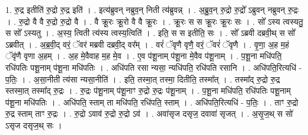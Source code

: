\documentclass[17pt]{extarticle}
\begin{document}
1. रु॒द्र इतीति॑ रु॒द्रो रु॒द्र इति॑ । . इत्य॑ब्रुवन् नब्रुव॒न् निती त्य॑ब्रुवन्न् । . अ॒ब्रु॒व॒न् रु॒द्रो रु॒द्रो᳚ ऽब्रुवन् नब्रुवन् रु॒द्रः । . रु॒द्रो वै वै रु॒द्रो रु॒द्रो वै । . वै क्रू॒रः क्रू॒रो वै वै क्रू॒रः । . क्रू॒रः स स क्रू॒रः क्रू॒रः सः । . सो᳚ ऽस्य त्वस्यतु॒ स सो᳚ ऽस्यतु । . अ॒स्य॒ त्विती त्य॑स्य त्वस्य॒त्विति॑ । . इति॒ स स इतीति॒ सः । . सो᳚ ऽब्रवी दब्रवी॒थ् स सो᳚ ऽब्रवीत् । . अ॒ब्र॒वी॒द् वरं॒ ॅवर॑ मब्रवी दब्रवी॒द् वर᳚म् । . वरं॑ ॅवृणै वृणै॒ वरं॒ ॅवरं॑ ॅवृणै । . वृ॒णा॒ अ॒ह म॒हं ॅवृ॑णै वृणा अ॒हम् । . अ॒ह मे॒वैवाह म॒ह मे॒व । . ए॒व प॑शू॒नाम् प॑शू॒ना मे॒वैव प॑शू॒नाम् । . प॒शू॒ना मधि॑पति॒ रधि॑पतिः पशू॒नाम् प॑शू॒ना मधि॑पतिः । . अधि॑पति रसा न्यसा॒ न्यधि॑पति॒ रधि॑पति रसानि । . अधि॑पति॒रित्यधि॑ - प॒तिः॒ । . अ॒सा॒नीती त्य॑सा न्यसा॒नीति॑ । . इति॒ तस्मा॒त् तस्मा॒ दितीति॒ तस्मा᳚त् । . तस्मा᳚द् रु॒द्रो रु॒द्र स्तस्मा॒त् तस्मा᳚द् रु॒द्रः । . रु॒द्रः प॑शू॒नाम् प॑शू॒नाꣳ रु॒द्रो रु॒द्रः प॑शू॒नाम् । . प॒शू॒ना मधि॑पति॒ रधि॑पतिः पशू॒नाम् प॑शू॒ना मधि॑पतिः । . अधि॑पति॒ स्ताम् ता मधि॑पति॒ रधि॑पति॒ स्ताम् । . अधि॑पति॒रित्यधि॑ - प॒तिः॒ । . ताꣳ रु॒द्रो रु॒द्र स्ताम् ताꣳ रु॒द्रः । . रु॒द्रो ऽवाव॑ रु॒द्रो रु॒द्रो ऽव॑ । . अवा॑सृज दसृज॒ दवावा॑ सृजत् । . अ॒सृ॒ज॒थ् स सो॑ ऽसृज दसृज॒थ् सः । \newline
\end{document}
